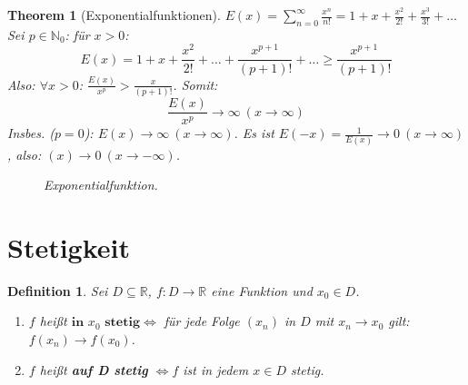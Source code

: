 \documentclass[titlepage,ngerman,a4paper,headsepline]{scrartcl}
\newcommand{\N}{\mathbb{N}}
\newcommand{\R}{\mathbb{R}}
\theoremstyle{named}
\newtheorem{namedtheorem}{Theorem} \counterwithin{namedtheorem}{section}
\theoremstyle{dotless}
\newtheorem*{definition}{Definition}
\begin{document}
\begin{namedtheorem}[Exponentialfunktionen] \label{6.4:prop-Exponentialfunktionen}
	$E(x) = \sum_{n=0}^{\infty} \frac{x^{n}}{n!} = 1 + x + \frac{x^{2}}{2!} + \frac{x^{3}}{3!} + \dotsc$ \\
	Sei $p \in \N_{0}$: für $x > 0$:
		$$ E(x) = 1 + x + \frac{x^{2}}{2!} + \dotsc + \frac{x^{p+1}}{(p+1)!} + \dotsc \geq \frac{x^{p+1}}{(p+1)!} $$
	Also: $\forall x > 0$: $\frac{E(x)}{x^{p}} > \frac{x}{(p+1)!}$.
	Somit:
		$$ \frac{E(x)}{x^{p}} \rightarrow \infty ~(x \rightarrow \infty) $$
	Insbes. ($p = 0$): $E(x) \rightarrow \infty ~(x \rightarrow \infty)$. Es ist $E(-x) = \frac{1}{E(x)} \rightarrow 0 ~(x \rightarrow \infty)$, also: $(x) \rightarrow  0 ~(x \rightarrow -\infty)$.
	\begin{figure*}[!ht] \centering
		\caption{Exponentialfunktion.}	
	\end{figure*}
\end{namedtheorem}


\newpage


\section{Stetigkeit}

\begin{definition}
	Sei $D \subseteq \R$, $f \colon D \rightarrow \R$ eine Funktion und $x_{0} \in D$. 
	\begin{enumerate}
		\item $f$ hei{\ss}t $\textbf{in }  x_{0} \textbf{ stetig} \iff$ für jede Folge $(x_{n})$ in $D$ mit $x_{n} \rightarrow x_{0}$ gilt: $f(x_{n}) \rightarrow f(x_{0})$.
		\item $f$ hei{\ss}t \textbf{auf D stetig} $\iff f$ ist in jedem $x \in D$ stetig.
	\end{enumerate}
\end{definition}
\end{document}
